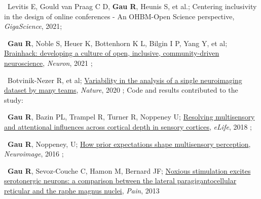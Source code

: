 

\textbullet~Levitis E, Gould van Praag C D, \textbf{Gau R}, Heunis S, et al.;
Centering inclusivity in the design of online conferences - An OHBM-Open Science perspective,
\textit{GigaScience},
2021; 

\textbullet~\textbf{Gau R}, Noble S, Heuer K, Bottenhorn K L, Bilgin I P, Yang Y, et al; 
\href{https://doi.org/10.1016/j.neuron.2021.04.001}{Brainhack: developing a culture of open, inclusive, community-driven neuroscience}, 
\textit{Neuron}, 
2021
\newline
{}; 

\textbullet~Botvinik-Nezer R, et al; 
\href{https://osf.io/zac8t/}{Variability in the analysis of a single neuroimaging dataset by many teams}, 
\textit{Nature}, 
2020
\newline
{}; 
Code and results contributed to the study:

\smallskip

\textbullet~\textbf{Gau R}, Bazin PL, Trampel R, Turner R, Noppeney U; 
\href{https://osf.io/x3uak/}{Resolving multisensory and attentional influences across cortical depth in sensory cortices}, 
\textit{eLife}, 
2018
\newline
{}; 

\textbullet~\textbf{Gau R}, Noppeney, U; 
\href{https://osf.io/8frkq/}{How prior expectations shape multisensory perception}, 
\textit{Neuroimage}, 
2016
\newline
{}; 

\textbullet~\textbf{Gau R}, Sevoz-Couche C, Hamon M, Bernard JF; 
\href{https://osf.io/ktcv9/}{Noxious stimulation excites serotonergic neurons: a comparison between the lateral paragigantocellular reticular and the raphe magnus nuclei}, 
\textit{Pain}, 
2013
\newline
{}

